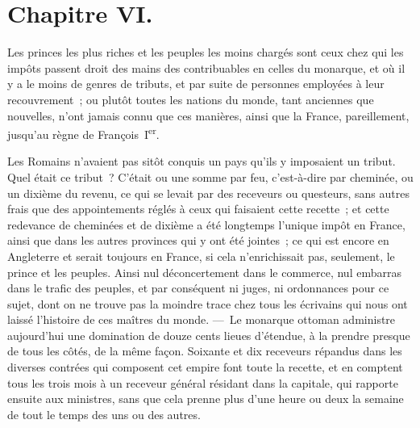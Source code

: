 \documentclass[french,twoside]{book} %
\begin{document}
\section[{Chapitre VI.}]{Chapitre VI.}
\noindent Les princes les plus riches et les peuples les moins chargés sont ceux chez qui les impôts passent droit des mains des contribuables en celles du monarque, et où il y a le moins de genres de tributs, et par suite de personnes employées à leur recouvrement ; ou plutôt toutes les nations du monde, tant anciennes que nouvelles, n’ont jamais connu que ces manières, ainsi que la France, pareillement, jusqu’au règne de François I\textsuperscript{er}.\par
Les Romains n’avaient pas sitôt conquis un pays qu’ils y imposaient un tribut. Quel était ce tribut ? C’était ou une somme par feu, c’est-à-dire par cheminée, ou un dixième du revenu, ce qui se levait par des receveurs ou questeurs, sans autres frais que des appointements réglés à ceux qui faisaient cette recette ; et cette redevance de cheminées et de dixième a été longtemps l’unique impôt en France, ainsi que dans les autres provinces qui y ont été jointes ; ce qui est encore en Angleterre et serait toujours en France, si cela n’enrichissait pas, seulement, le prince et les peuples. Ainsi nul déconcertement dans le commerce, nul embarras dans le trafic des peuples, et par conséquent ni juges, ni ordonnances pour ce sujet, dont on ne trouve pas la moindre trace chez tous les écrivains qui nous ont laissé l’histoire de ces maîtres du monde. — Le monarque ottoman administre aujourd’hui une domination de douze cents lieues d’étendue, à la prendre presque de tous les côtés, de la même façon. Soixante et dix receveurs répandus dans les diverses contrées qui composent cet empire font toute la recette, et en comptent tous les trois mois à un receveur général résidant dans la capitale, qui rapporte ensuite aux ministres, sans que cela prenne plus d’une heure ou deux la semaine de tout le temps des uns ou des autres.\par
\end{document}
